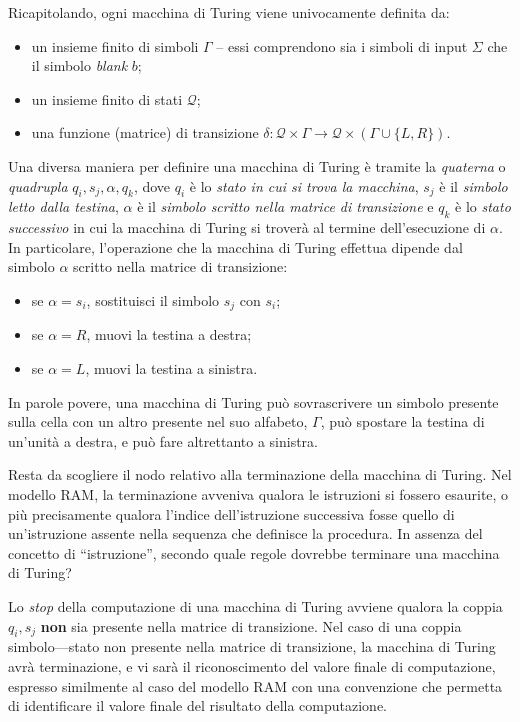 \documentclass[10pt]{book}
\begin{document}
Ricapitolando, ogni macchina di Turing viene univocamente definita da:
\begin{itemize}
    \item un insieme finito di simboli $\Gamma$ \--- essi comprendono sia i
        simboli di input $\Sigma$ che il simbolo \emph{blank} $b$;
    \item un insieme finito di stati $\mathcal Q$;
    \item una funzione (matrice) di transizione $\delta  : \mathcal Q \times
        \Gamma \rightarrow \mathcal Q \times (\Gamma \cup \{L,R\})$.
\end{itemize}

Una diversa maniera per definire una macchina di Turing è tramite la
\emph{quaterna} o \emph{quadrupla} $q_i, s_j, \alpha, q_k$, dove $q_i$ è lo
\emph{stato in cui si trova la macchina}, $s_j$ è il \emph{simbolo letto dalla
testina}, $\alpha$ è il \emph{simbolo scritto nella matrice di transizione} e
$q_k$ è lo \emph{stato successivo} in cui la macchina di Turing si troverà al
termine dell'esecuzione di $\alpha$. In particolare, l'operazione che la
macchina di Turing effettua dipende dal simbolo $\alpha$ scritto nella matrice
di transizione:
\begin{itemize}
    \item se $\alpha = s_i$, sostituisci il simbolo $s_j$ con $s_i$;
    \item se $\alpha = R$, muovi la testina a destra;
    \item se $\alpha = L$, muovi la testina a sinistra.
\end{itemize}

In parole povere, una macchina di Turing può sovrascrivere un simbolo presente
sulla cella con un altro presente nel suo alfabeto, $\Gamma$, può spostare la
testina di un'unità a destra, e può fare altrettanto a sinistra.

Resta da scogliere il nodo relativo alla terminazione della macchina di Turing.
Nel modello RAM, la terminazione avveniva qualora le istruzioni si fossero
esaurite, o più precisamente qualora l'indice dell'istruzione successiva fosse
quello di un'istruzione assente nella sequenza che definisce la procedura. In
assenza del concetto di ``istruzione'', secondo quale regole dovrebbe terminare
una macchina di Turing? 

Lo \emph{stop} della computazione di una macchina di Turing avviene qualora la
coppia $q_i, s_j$ \textbf{non} sia presente nella matrice di transizione. Nel
caso di una coppia simbolo\----stato non presente nella matrice di transizione,
la macchina di Turing avrà terminazione, e vi sarà il riconoscimento del valore
finale di computazione, espresso similmente al caso del modello RAM con una
convenzione che permetta di identificare il valore finale del risultato della
computazione.
\end{document}
